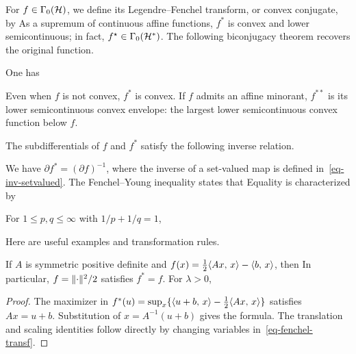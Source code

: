 For $f \in \Gamma_0(\mathcal{H})$, we define its Legendre--Fenchel transform, or convex conjugate, by
As a supremum of continuous affine functions, $f^*$ is convex and lower semicontinuous; in fact, $f^\star \in \Gamma_0(\mathcal{H}^*)$. The following biconjugacy theorem recovers the original function.

\begin{thm}
One has
\end{thm}

Even when $f$ is not convex, $f^*$ is convex. If $f$ admits an affine minorant, $f^{**}$ is its lower semicontinuous convex envelope: the largest lower semicontinuous convex function below $f$.


The subdifferentials of $f$ and $f^*$ satisfy the following inverse relation.

\begin{prop}
We have $\partial f^* = (\partial f)^{-1}$, where the inverse of a set-valued map is defined in~\eqref{eq-inv-setvalued}. The Fenchel--Young inequality states that
Equality is characterized by
\end{prop}

\begin{prop}\label{prop-dual-lp}
	For $1\leq p,q\leq\infty$ with $1/p+1/q=1$,
\end{prop}


Here are useful examples and transformation rules.

\begin{prop}\label{eq-example-legendre}
If $A$ is symmetric positive definite and
$f(x)=\frac12\langle Ax,\,x\rangle-\langle b,\,x\rangle$, then
In particular, $f=\lVert\cdot\rVert^2/2$ satisfies $f^*=f$. For $\lambda>0$,
\end{prop}
\begin{proof}
The maximizer in $f^*(u)=\sup_x\{\langle u+b,\,x\rangle-\frac12\langle Ax,\,x\rangle\}$ satisfies $Ax=u+b$. Substitution of $x=A^{-1}(u+b)$ gives the formula. The translation and scaling identities follow directly by changing variables in~\eqref{eq-fenchel-transf}.
\end{proof}

